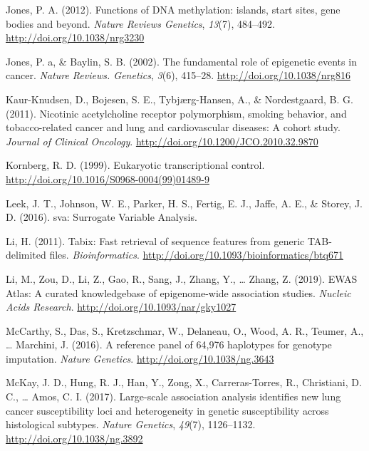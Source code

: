 \documentclass[11pt,twoside]{bristolthesis}
\newlength{\cslhangindent}
\newenvironment{cslreferences}%
  {\setlength{\parindent}{0pt}%
  \everypar{\setlength{\hangindent}{\cslhangindent}}\ignorespaces}%
  {\par}
\begin{document}
\begin{cslreferences}
\leavevmode\hypertarget{ref-Jones2012}{}%
Jones, P. A. (2012). Functions of DNA methylation: islands, start sites, gene bodies and beyond. \emph{Nature Reviews Genetics}, \emph{13}(7), 484--492. \url{http://doi.org/10.1038/nrg3230}

\leavevmode\hypertarget{ref-Jones2002}{}%
Jones, P. a, \& Baylin, S. B. (2002). The fundamental role of epigenetic events in cancer. \emph{Nature Reviews. Genetics}, \emph{3}(6), 415--28. \url{http://doi.org/10.1038/nrg816}

\leavevmode\hypertarget{ref-Kaur-Knudsen2011}{}%
Kaur-Knudsen, D., Bojesen, S. E., Tybjærg-Hansen, A., \& Nordestgaard, B. G. (2011). Nicotinic acetylcholine receptor polymorphism, smoking behavior, and tobacco-related cancer and lung and cardiovascular diseases: A cohort study. \emph{Journal of Clinical Oncology}. \url{http://doi.org/10.1200/JCO.2010.32.9870}

\leavevmode\hypertarget{ref-Kornberg1999}{}%
Kornberg, R. D. (1999). Eukaryotic transcriptional control. \url{http://doi.org/10.1016/S0968-0004(99)01489-9}

\leavevmode\hypertarget{ref-Leek2016}{}%
Leek, J. T., Johnson, W. E., Parker, H. S., Fertig, E. J., Jaffe, A. E., \& Storey, J. D. (2016). sva: Surrogate Variable Analysis.

\leavevmode\hypertarget{ref-Li2011}{}%
Li, H. (2011). Tabix: Fast retrieval of sequence features from generic TAB-delimited files. \emph{Bioinformatics}. \url{http://doi.org/10.1093/bioinformatics/btq671}

\leavevmode\hypertarget{ref-Li2019}{}%
Li, M., Zou, D., Li, Z., Gao, R., Sang, J., Zhang, Y., \ldots{} Zhang, Z. (2019). EWAS Atlas: A curated knowledgebase of epigenome-wide association studies. \emph{Nucleic Acids Research}. \url{http://doi.org/10.1093/nar/gky1027}

\leavevmode\hypertarget{ref-McCarthy2016}{}%
McCarthy, S., Das, S., Kretzschmar, W., Delaneau, O., Wood, A. R., Teumer, A., \ldots{} Marchini, J. (2016). A reference panel of 64,976 haplotypes for genotype imputation. \emph{Nature Genetics}. \url{http://doi.org/10.1038/ng.3643}

\leavevmode\hypertarget{ref-McKay2017}{}%
McKay, J. D., Hung, R. J., Han, Y., Zong, X., Carreras-Torres, R., Christiani, D. C., \ldots{} Amos, C. I. (2017). Large-scale association analysis identifies new lung cancer susceptibility loci and heterogeneity in genetic susceptibility across histological subtypes. \emph{Nature Genetics}, \emph{49}(7), 1126--1132. \url{http://doi.org/10.1038/ng.3892}


\end{cslreferences}
\end{document}
